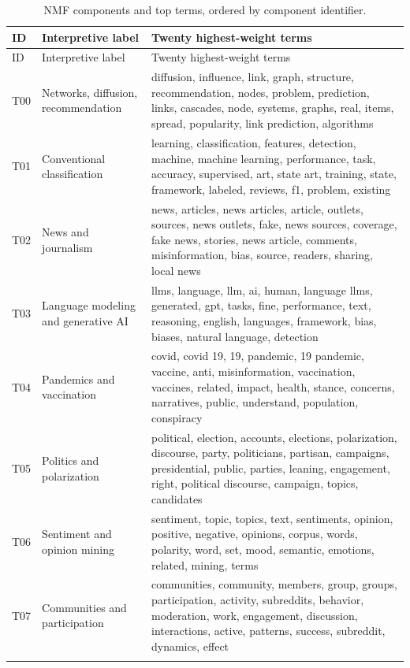 \begingroup
\small
\begin{longtable}{@{}p{}p{}p{}@{}}
\caption{NMF components and top terms, ordered by component identifier.}\label{tab:topicterms}\\
\toprule
ID & Interpretive label & Twenty highest-weight terms \\
\midrule
\endfirsthead
\toprule
ID & Interpretive label & Twenty highest-weight terms \\
\midrule
\endhead
\bottomrule
\endfoot
T00 & Networks, diffusion, recommendation & diffusion, influence, link, graph, structure, recommendation, nodes, problem, prediction, links, cascades, node, systems, graphs, real, items, spread, popularity, link prediction, algorithms \\ \addlinespace
T01 & Conventional classification & learning, classification, features, detection, machine, machine learning, performance, task, accuracy, supervised, art, state art, training, state, framework, labeled, reviews, f1, problem, existing \\ \addlinespace
T02 & News and journalism & news, articles, news articles, article, outlets, sources, news outlets, fake, news sources, coverage, fake news, stories, news article, comments, misinformation, bias, source, readers, sharing, local news \\ \addlinespace
T03 & Language modeling and generative AI & llms, language, llm, ai, human, language llms, generated, gpt, tasks, fine, performance, text, reasoning, english, languages, framework, bias, biases, natural language, detection \\ \addlinespace
T04 & Pandemics and vaccination & covid, covid 19, 19, pandemic, 19 pandemic, vaccine, anti, misinformation, vaccination, vaccines, related, impact, health, stance, concerns, narratives, public, understand, population, conspiracy \\ \addlinespace
T05 & Politics and polarization & political, election, accounts, elections, polarization, discourse, party, politicians, partisan, campaigns, presidential, public, parties, leaning, engagement, right, political discourse, campaign, topics, candidates \\ \addlinespace
T06 & Sentiment and opinion mining & sentiment, topic, topics, text, sentiments, opinion, positive, negative, opinions, corpus, words, polarity, word, set, mood, semantic, emotions, related, mining, terms \\ \addlinespace
T07 & Communities and participation & communities, community, members, group, groups, participation, activity, subreddits, behavior, moderation, work, engagement, discussion, interactions, active, patterns, success, subreddit, dynamics, effect \\ \addlinespace

\end{longtable}
